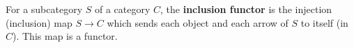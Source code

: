 For a subcategory $S$ of a category $C$, the \textbf{inclusion functor} is the injection (inclusion) map $S \rightarrow C$ which sends each object and each arrow of $S$ to itself (in $C$). This map is a functor.
